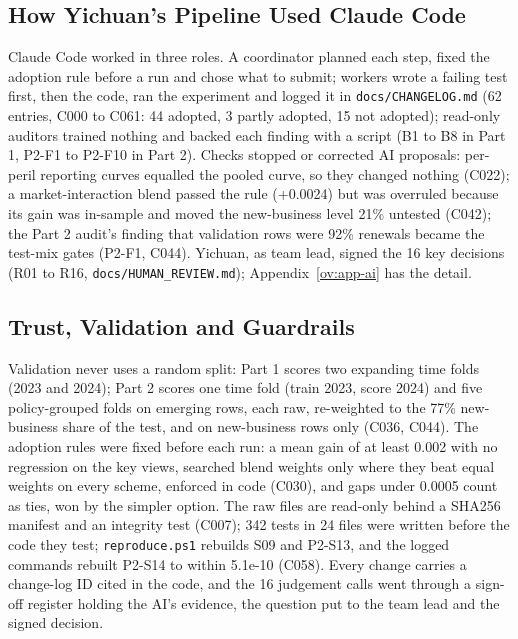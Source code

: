 \documentclass{rapport}
\begin{document}
\subsection{How Yichuan's Pipeline Used Claude Code}

Claude Code worked in three roles. A coordinator planned each step, fixed the adoption rule before a run and chose what
to submit; workers wrote a failing test first, then the code, ran the experiment and logged it in
\texttt{docs/CHANGELOG.md} (62 entries, C000 to C061: 44 adopted, 3 partly adopted, 15 not adopted); read-only
auditors trained nothing and backed each finding with a script (B1 to B8 in Part 1, P2-F1 to P2-F10 in Part 2). Checks
stopped or corrected AI proposals: per-peril reporting curves equalled the pooled curve, so they changed nothing
(C022); a market-interaction blend passed the rule (+0.0024) but was overruled because its gain was in-sample and moved
the new-business level 21\% untested (C042); the Part 2 audit's finding that validation rows were 92\% renewals became
the test-mix gates (P2-F1, C044). Yichuan, as team lead, signed the 16 key decisions (R01 to R16,
\texttt{docs/HUMAN\_REVIEW.md}); Appendix~\ref{ov:app-ai} has the detail.

\subsection{Trust, Validation and Guardrails}
\label{ov:trust}

Validation never uses a random split: Part 1 scores two expanding time folds (2023 and 2024); Part 2 scores one time
fold (train 2023, score 2024) and five policy-grouped folds on emerging rows, each raw, re-weighted to the 77\%
new-business share of the test, and on new-business rows only (C036, C044). The adoption rules were fixed before each
run: a mean gain of at least 0.002 with no regression on the key views, searched blend weights only where they beat
equal weights on every scheme, enforced in code (C030), and gaps under 0.0005 count as ties, won by the simpler option.
The raw files are read-only behind a SHA256 manifest and an integrity test (C007); 342 tests in 24 files were written
before the code they test; \texttt{reproduce.ps1} rebuilds S09 and P2-S13, and the logged commands rebuilt P2-S14 to
within 5.1e-10 (C058). Every change carries a change-log ID cited in the code, and the 16 judgement calls went through
a sign-off register holding the AI's evidence, the question put to the team lead and the signed decision.
\end{document}
